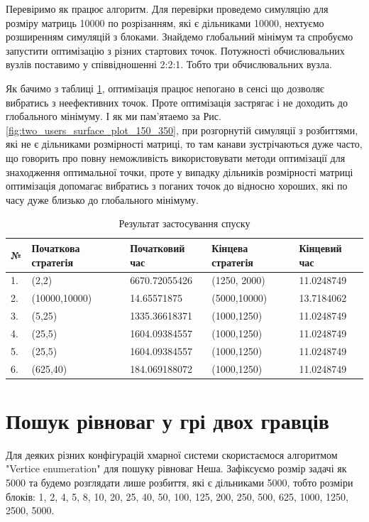 Перевіримо як працює алгоритм. Для перевірки проведемо симуляцію для розміру матриць 10000 по розрізанням, які є дільниками 10000, нехтуємо розширенням симуляцій з блоками. Знайдемо глобальний мінімум та спробуємо запустити оптимізацію з різних стартових точок. Потужності обчислювальних вузлів поставимо у співвідношенні 2:2:1. Тобто три обчислювальних вузла.

Як бачимо з таблиці \ref{table:optimize_results}, оптимізація працює непогано в сенсі що дозволяє вибратись з неефективних точок. Проте оптимізація застрягає і не доходить до глобального мінімуму. І як ми пам'ятаемо за Рис. \ref{fig:two_users_surface_plot_150_350}, при розгорнутій симуляції з розбиттями, які не є дільниками розмірності матриці, то там канави зустрічаються дуже часто, що говорить про повну неможливість використовувати методи оптимізації для знаходження оптимальної точки, проте у випадку дільників розмірності матриці оптимізація допомагає вибратись з поганих точок до відносно хороших, які по часу дуже близько до глобального мінімуму.

\begin{table}[H]
	\caption{Результат застосування спуску}
	\label{table:optimize_results}
	\begin{tabular}{|l|l|l|l|l|}
		\hline
		№ & Початкова стратегія & Початковий час 	& Кінцева стратегія & Кінцевий час
		\\ \hline
		1.& (2,2)				& 6670.72055426     &  (1250, 2000) 	& 11.0248749
		\\ \hline
		2.& (10000,10000)		& 14.65571875   	&  (5000,10000)		& 13.7184062
		\\ \hline
		3.& (5,25)				& 1335.36618371		&  (1000,1250)		& 11.0248749
		\\ \hline
		4.& (25,5)				& 1604.09384557		&  (1000,1250)		& 11.0248749
		\\ \hline
		5.& (25,5)				& 1604.09384557		&  (1000,1250)		& 11.0248749
		\\ \hline
		6.& (625,40)			& 184.069188072		&  (1000,1250)		& 11.0248749
		\\ \hline
		
	\end{tabular}
\end{table}

\section{Пошук рівноваг у грі двох гравців}

Для деяких різних конфігурацій хмарної системи скористаємося алгоритмом "Vertice enumeration" для пошуку рівноваг Неша. Зафіксуємо розмір задачі як 5000 та будемо розглядати лише розбиття, які є дільниками 5000, тобто розміри блоків: 1, 2, 4, 5, 8, 10, 20, 25, 40, 50,  100, 125, 200, 250, 500, 625, 1000, 1250, 2500, 5000.

